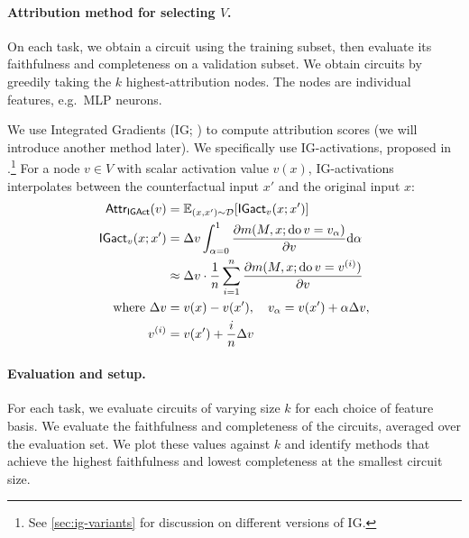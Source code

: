\documentclass{article}
\theoremstyle{plain}
\theoremstyle{definition}
\theoremstyle{remark}
\begin{document}
\paragraph{Attribution method for selecting $V$.} On each task, we obtain a circuit using the training subset, then evaluate its faithfulness and completeness
on a validation subset. We obtain circuits by greedily taking the $k$ highest-attribution nodes. The nodes are individual features, e.g.~MLP neurons.

We use Integrated Gradients (IG; \citealp{sundararajan2017axiomatic}) to compute attribution scores (we will introduce another method later).
We specifically use IG-activations, proposed in \citet{marks2025sparse}.\footnote{See \cref{sec:ig-variants} for discussion on different versions of IG.} For a node $v \in V$ with scalar activation value $v(x)$, IG-activations interpolates between the counterfactual input $x'$ and the original input $x$:
\begin{align}
\mathsf{Attr}_{\mathsf{IGAct}}(v) &= \mathbb{E}_{(x, x') \sim \mathcal{D}} [\mathsf{IGact}_v(x; x')]\\
\mathsf{IGact}_v(x; x') &= \Delta v \int_{\alpha=0}^1\frac{\partial m(M, x; \text{do}\,v = v_\alpha)}{\partial v} \mathrm{d}\alpha \\
&\approx \Delta v \cdot \frac{1}{n}\sum_{i=1}^n\frac{\partial m(M, x; \text{do}\,v = v^{(i)})}{\partial v}\\
\text{where } \Delta v &= v(x) - v(x'), \quad v_\alpha = v(x') + \alpha \Delta v, \notag \\
v^{(i)} &= v(x') + \frac{i}{n}\Delta v
\end{align}

\paragraph{Evaluation and setup.} For each task, we evaluate circuits of varying size $k$ for each choice of feature basis. We evaluate the
faithfulness and completeness of the circuits, averaged over the evaluation set. We plot these values against $k$ and identify methods that achieve the highest faithfulness and lowest completeness at the smallest circuit size.
\end{document}
